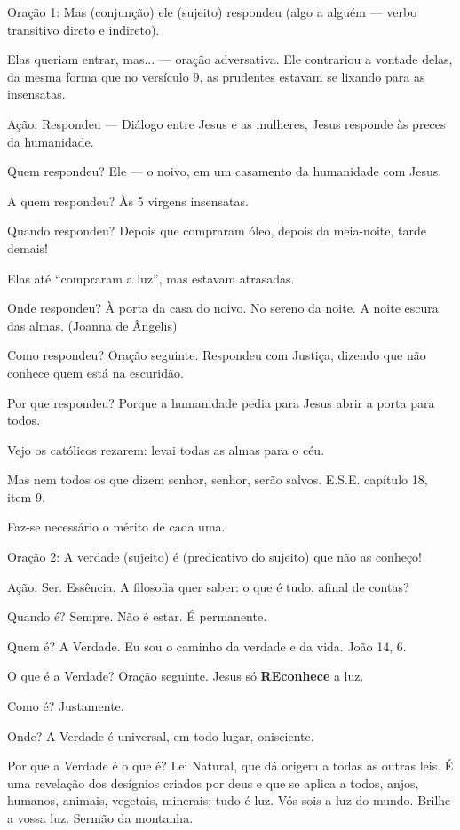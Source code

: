 \documentclass{rbfin}
\begin{document}
\begin{multicols}{2}
Oração 1: Mas (conjunção) ele (sujeito) respondeu (algo a alguém --- verbo transitivo direto e indireto).

Elas queriam entrar, mas... --- oração adversativa. Ele contrariou a vontade delas, da mesma forma que no versículo 9, as prudentes estavam se lixando para as insensatas.

Ação: Respondeu --- Diálogo entre Jesus e as mulheres, Jesus responde às preces da humanidade.

Quem respondeu? Ele --- o noivo, em um casamento da humanidade com Jesus.

A quem respondeu? Às 5 virgens insensatas.

Quando respondeu? Depois que compraram óleo, depois da meia-noite, tarde demais! 

Elas até ``compraram a luz'', mas estavam atrasadas.

Onde respondeu? À porta da casa do noivo. No sereno da noite. A noite escura das almas. (Joanna de Ângelis)

Como respondeu? Oração seguinte. Respondeu com Justiça, dizendo que não conhece quem está na escuridão.

Por que respondeu? Porque a humanidade pedia para Jesus abrir a porta para todos.

Vejo os católicos rezarem: levai todas as almas para o céu.

Mas nem todos os que dizem senhor, senhor, serão salvos. E.S.E. capítulo 18, item 9.

Faz-se necessário o mérito de cada uma.

\dotfill

\newpage

Oração 2: A verdade (sujeito) é (predicativo do sujeito) que não as conheço!

Ação: Ser. Essência. A filosofia quer saber: o que é tudo, afinal de contas?

Quando é? Sempre. Não é estar. É permanente.

Quem é? A Verdade. Eu sou o caminho da verdade e da vida. João 14, 6.

O que é a Verdade? Oração seguinte. Jesus só \textbf{REconhece} a luz.

Como é? Justamente.

Onde? A Verdade é universal, em todo lugar, onisciente.

Por que a Verdade é o que é? Lei Natural, que dá origem a todas as outras leis. É uma revelação dos desígnios criados por deus e que se aplica a todos, anjos, humanos, animais, vegetais, minerais: tudo é luz. Vós sois a luz do mundo. Brilhe a vossa luz. Sermão da montanha.


\end{multicols}
\end{document}
